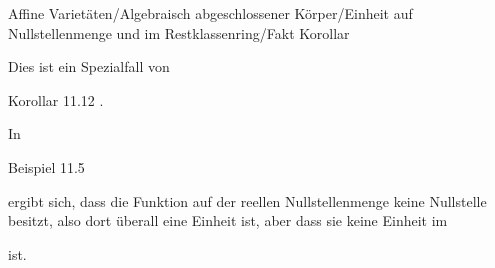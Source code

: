 {Affine Varietäten/Algebraisch abgeschlossener Körper/Einheit auf Nullstellenmenge und im Restklassenring/Fakt}
{Korollar}
{}
{



\faktzusatz {}
\faktzusatz {}





}
{





Dies ist ein Spezialfall von

Korollar 11.12
.




}


In

Beispiel 11.5

ergibt sich, dass die Funktion
 auf der reellen Nullstellenmenge
 keine Nullstelle besitzt, also dort überall eine Einheit ist, aber dass sie keine Einheit im

 ist.
